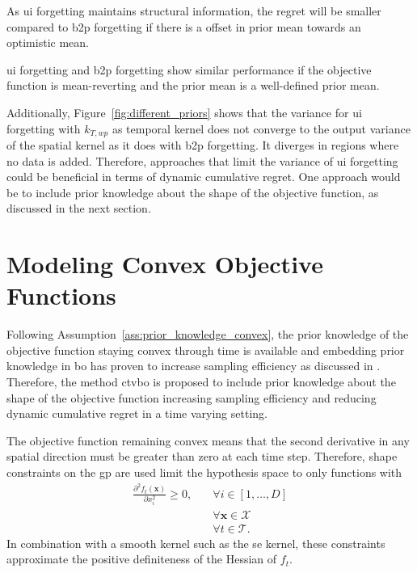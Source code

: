 \begin{hyp}
As \gls{ui} forgetting maintains structural information, the regret will be smaller compared to \gls{b2p} forgetting if there is a offset in prior mean towards an optimistic mean.
\label{hyp:ui_structural_information}
\end{hyp}

\begin{hyp}
\gls{ui} forgetting and \gls{b2p} forgetting show similar performance if the objective function is mean-reverting and the prior mean is a well-defined prior mean.
\label{hyp:ui_good_mean}
\end{hyp}

Additionally, Figure~\ref{fig:different_priors} shows that the variance for \gls{ui} forgetting with $k_{T,wp}$ as temporal kernel does not converge to the output variance of the spatial kernel as it does with \gls{b2p} forgetting. It diverges in regions where no data is added. Therefore, approaches that limit the variance of \gls{ui} forgetting could be beneficial in terms of dynamic cumulative regret. One approach would be to include prior knowledge about the shape of the objective function, as discussed in the next section.


\section{Modeling Convex Objective Functions}
\label{sec:model_convex_functions}

Following Assumption~\ref{ass:prior_knowledge_convex}, the prior knowledge of the objective function staying convex through time is available and embedding prior knowledge in \gls{bo} has proven to increase sampling efficiency as discussed in . Therefore, the method \gls{ctvbo} is proposed to include prior knowledge about the shape of the objective function increasing sampling efficiency and reducing dynamic cumulative regret in a time varying setting.

The objective function remaining convex means that the second derivative in any spatial direction must be greater than zero at each time step. Therefore, shape constraints on the \gls{gp} are used limit the hypothesis space to only functions with
\begin{equation}
    \begin{split}
        \frac{\partial^2 f_t(\mathbf{x})}{\partial x_i^2} \geq 0, \quad &\forall i \in [1, \dots, D]  \\
        &\forall \mathbf{x} \in \mathcal{X} \\
        &\forall t \in \mathcal{T}.
    \end{split}
\label{eq:convex_functions}
\end{equation}
In combination with a smooth kernel such as the \gls{se} kernel, these constraints approximate the positive definiteness of the Hessian of $f_t$.


